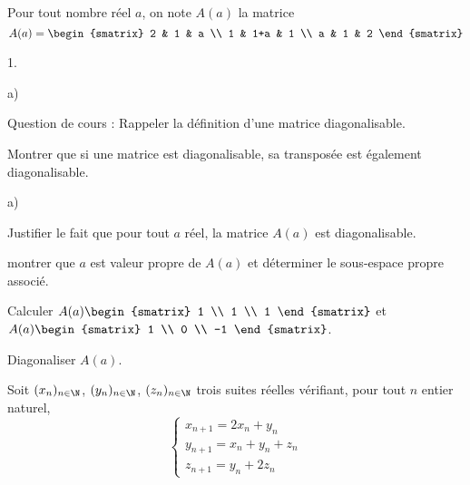 \documentclass[11pt]{article}%
\begin{document}
\begin{exerciceAP}~\\
  Pour tout nombre réel $a$, on note $A(a)$ la matrice
  \[
  A(a) = 
  \begin{smatrix} 
    2 & 1 & a \\ 
    1 & 1+a & 1 \\ 
    a & 1 & 2
  \end{smatrix}
 \]
  \begin{noliste}{1.}
    \setlength{\itemsep}{2mm}
  \item \begin{noliste}{a)}
    \setlength{\itemsep}{2mm}
    \item Question de cours : Rappeler la définition d'une matrice
      diagonalisable.
    \item Montrer que si une matrice est diagonalisable, sa transposée
      est également diagonalisable.
    \end{noliste} 
  \item 
    \begin{noliste}{a)}
    \setlength{\itemsep}{2mm}
    \item Justifier le fait que pour tout $a$ réel, la matrice $A(a)$
      est diagonalisable.
    \item montrer que $a$ est valeur propre de $A(a)$ et déterminer le
      sous-espace propre associé.
    \item Calculer $A(a) 
      \begin{smatrix} 
        1 \\ 
        1 \\ 
        1 
      \end{smatrix}$ et $A(a) 
      \begin{smatrix} 
        1 \\ 
        0 \\ 
        -1
      \end{smatrix}$.
    \item Diagonaliser $A(a)$.
    \end{noliste}
  \item Soit $(x_n)_{n \in \N}$, $(y_n)_{n \in \N}$, $(z_n)_{n \in
      \N}$ trois suites réelles vérifiant, pour tout $n$ entier
    naturel,
    \[
    \left\{ 
      \begin{array}{l} 
        x_{n+1} = 2 x_n + y_n \\ 
        y_{n+1} = x_n + y_n + z_n \\ 
        z_{n+1} = y_n + 2 z_n 
      \end{array} 
\]
\end{noliste}
\end{exerciceAP}
\end{document}
